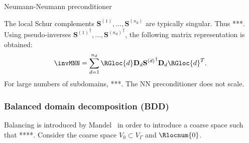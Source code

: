 \documentclass{article}
\begin{document}
\begin{algorithm}[ht]
	\caption{Neumann-Neumann preconditioner}
	\label{alg:NN}
	\begin{algorithmic}[1]
		\ENDFOR
	\end{algorithmic}
\end{algorithm}

The local Schur complements $\mathbf{S}^{(1)},\dots,\mathbf{S}^{(n_d)}$ are typically singular.
Thus ***.
Using pseudo-inverses ${\mathbf{S}^{(1)}}^\dagger,\dots,{\mathbf{S}^{(n_d)}}^\dagger$, the following matrix representation is obtained:
\begin{align}
\invMNN=\sum_{d=1}^{n_d}
\RGloc{d}
\mathbf{D}_d
{\mathbf{S}^{(d)}}^\dagger
\mathbf{D}_d
\RGloc{d}^T.
\end{align}
For large numbers of subdomains, ***.
The NN preconditioner does not scale.

\subsubsection{Balanced domain decomposition (BDD)}
Balancing is introduced by Mandel~\cite{Mandel1993} in order to introduce a coarse space such that ****.
Consider the coarse space $V_0\subset V_\Gamma$ and $\Rlocnum{0}$.
\end{document}
